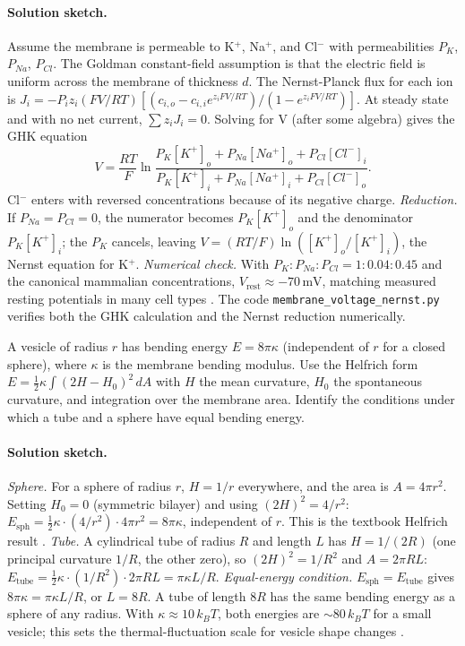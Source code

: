 \paragraph{Solution sketch.}
Assume the membrane is permeable to K$^+$, Na$^+$, and Cl$^-$ with
permeabilities $P_K$, $P_{Na}$, $P_{Cl}$. The Goldman constant-field
assumption is that the electric field is uniform across the membrane
of thickness $d$. The Nernst-Planck flux for each ion is
$J_i = -P_i z_i (FV/RT) [(c_{i,o} - c_{i,i} e^{z_i FV/RT})/(1 - e^{z_i FV/RT})]$.
At steady state and with no net current,
$\sum z_i J_i = 0$. Solving for V (after some algebra) gives the GHK
equation
\[
V = \frac{RT}{F} \ln
\frac{P_K [K^+]_o + P_{Na}[Na^+]_o + P_{Cl}[Cl^-]_i}
     {P_K [K^+]_i + P_{Na}[Na^+]_i + P_{Cl}[Cl^-]_o}.
\]
Cl$^-$ enters with reversed concentrations because of its negative
charge. \emph{Reduction.} If $P_{Na} = P_{Cl} = 0$, the numerator
becomes $P_K [K^+]_o$ and the denominator $P_K [K^+]_i$; the $P_K$
cancels, leaving $V = (RT/F)\ln([K^+]_o/[K^+]_i)$, the Nernst equation
for K$^+$. \emph{Numerical check.} With $P_K : P_{Na} : P_{Cl} =
1 : 0.04 : 0.45$ and the canonical mammalian concentrations,
$V_{\text{rest}} \approx -70\,\text{mV}$, matching measured resting
potentials in many cell types \cite{text:v6c01-hille-channels-2001}.
The code \texttt{membrane\_voltage\_nernst.py} verifies both the
GHK calculation and the Nernst reduction numerically.

\begin{exercise}
A vesicle of radius $r$ has bending energy
$E = 8\pi \kappa$ (independent of $r$ for a closed sphere), where
$\kappa$ is the membrane bending modulus. Use the Helfrich form
$E = \frac{1}{2}\kappa \int (2H - H_0)^2 \,dA$ with $H$ the mean
curvature, $H_0$ the spontaneous curvature, and integration over the
membrane area. Identify the conditions under which a tube and a
sphere have equal bending energy.
\end{exercise}

\paragraph{Solution sketch.}
\emph{Sphere.} For a sphere of radius $r$, $H = 1/r$ everywhere, and
the area is $A = 4\pi r^2$. Setting $H_0 = 0$ (symmetric bilayer) and
using $(2H)^2 = 4/r^2$:
$E_{\text{sph}} = \tfrac{1}{2}\kappa \cdot (4/r^2) \cdot 4\pi r^2
= 8\pi\kappa$, independent of $r$. This is the textbook Helfrich
result \cite{paper:v6c01-helfrich-1973}.
\emph{Tube.} A cylindrical tube of radius $R$ and length $L$ has
$H = 1/(2R)$ (one principal curvature $1/R$, the other zero), so
$(2H)^2 = 1/R^2$ and $A = 2\pi R L$:
$E_{\text{tube}} = \tfrac{1}{2}\kappa \cdot (1/R^2) \cdot 2\pi R L
= \pi\kappa L / R$.
\emph{Equal-energy condition.} $E_{\text{sph}} = E_{\text{tube}}$
gives $8\pi\kappa = \pi\kappa L/R$, or $L = 8R$. A tube of length
$8R$ has the same bending energy as a sphere of any radius. With
$\kappa \approx 10\,k_B T$, both energies are $\sim 80\,k_B T$ for a
small vesicle; this sets the thermal-fluctuation scale for vesicle
shape changes \cite{text:v6c01-phillips-physical-2012}.

